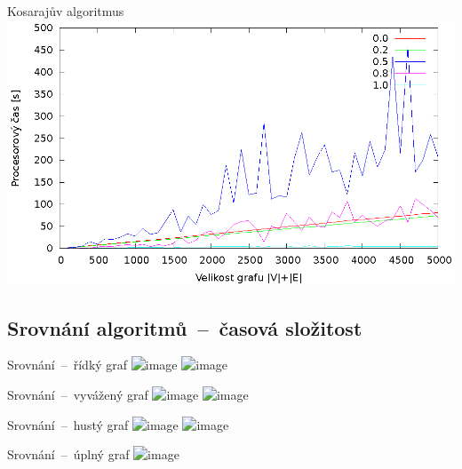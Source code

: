\documentclass{beamer}
\begin{document}
\begin{frame}{Kosarajův algoritmus}
  \includegraphics[width=\textwidth,height=\textheight,keepaspectratio]{kosaraju_nx}
\end{frame}

\subsection{Srovnání algoritmů\ --\ časová složitost}
\begin{frame}{Srovnání\ --\ řídký graf}
  \includegraphics<1>[width=\textwidth,height=\textheight,keepaspectratio]{0_2}
  \includegraphics<2>[width=\textwidth,height=\textheight,keepaspectratio]{0_2_no_kosa}
\end{frame}
\begin{frame}{Srovnání\ --\ vyvážený graf}
  \includegraphics<1>[width=\textwidth,height=\textheight,keepaspectratio]{0_5}
  \includegraphics<2>[width=\textwidth,height=\textheight,keepaspectratio]{0_5_no_kosa}
\end{frame}
\begin{frame}{Srovnání\ --\ hustý graf}
  \includegraphics<1>[width=\textwidth,height=\textheight,keepaspectratio]{0_8}
  \includegraphics<2>[width=\textwidth,height=\textheight,keepaspectratio]{0_8_no_kosa}
\end{frame}
\begin{frame}{Srovnání\ --\ úplný graf}
  \includegraphics<1>[width=\textwidth,height=\textheight,keepaspectratio]{1_0}
\end{frame}
\end{document}

